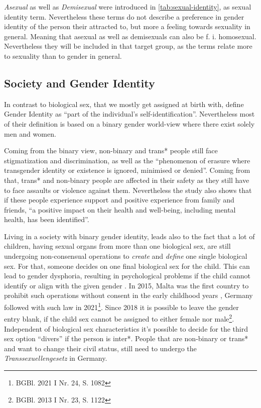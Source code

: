 \textit{Asexual} as well as \textit{Demisexual} were introduced in \autoref{tab:sexual-identity}, as sexual identity term. Nevertheless these terms do not describe a preference in gender identity of the person their attracted to, but more a feeling towards sexuality in general. Meaning that asexual as well as demisexuals can also be f. i. homosexual. Nevertheless they will be included in that target group, as the terms relate more to sexuality than to gender in general.


\subsection{Society and Gender Identity}
In contrast to biological sex, that we mostly get assigned at birth with, \citet{shively} define Gender Identity as \enquote{part of the individual's self-identification}. Nevertheless most of their definition is based on a binary gender world-view where there exist solely men and women. 

Coming from the binary view, non-binary and trans* people still face stigmatization and discrimination, as well as the \enquote{phenomenon of erasure where transgender identity or existence is ignored, minimised or denied}. Coming from that, trans* and non-binary people are affected in their safety as they still have to face assaults or violence against them. Nevertheless the study also shows that if these people experience support and positive experience from family and friends, \enquote{a positive impact on their health and well-being, including mental health, has been identified}\citep{trans-nb}.

Living in a society with binary gender identity, leads also to the fact that a lot of children, having  sexual organs from more than one biological sex, are still undergoing non-consensual operations to \textit{create} and \textit{define} one single biological sex. For that, someone decides on one final biological sex for the child. This can lead to gender dysphoria, resulting in psychological problems if the child cannot identify or align with the given gender \citep{furtado}. In 2015, Malta was the first country to prohibit such operations without consent in the early childhood years \citep{intersex-history}, Germany followed with such law in 2021\footnote{BGBl. 2021 I Nr. 24, S. 1082}. Since 2018 it is possible to leave the gender entry blank, if the child sex cannot be assigned to either female nor male\footnote{BGBl. 2013 I Nr. 23, S. 1122}. Independent of biological sex characteristics it's possible to decide for the third sex option \enquote{divers} if the person is inter*. People that are non-binary or trans* and want to change their civil status, still need to undergo the \textit{Transsexuellengesetz} \citep{bmi} in Germany. 


